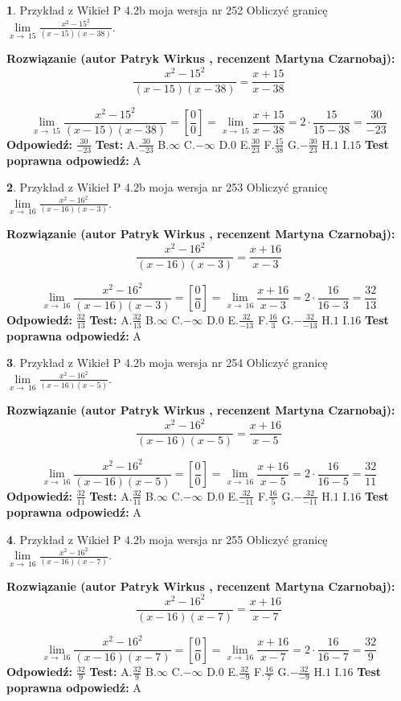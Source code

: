 \documentclass[12pt, a4paper]{article}
\theoremstyle{definition} %
\newtheorem{zad}{}
\newcommand{\zadStart}[1]{\begin{zad}#1\newline}
\newcommand{\zadStop}{\end{zad}}
\newcommand{\rozwStart}[2]{\noindent \textbf{Rozwiązanie (autor #1 , recenzent #2): }\newline}
\newcommand{\rozwStop}{\newline}
\newcommand{\odpStart}{\noindent \textbf{Odpowiedź:}\newline}
\newcommand{\odpStop}{\newline}
\newcommand{\testStart}{\noindent \textbf{Test:}\newline}
\newcommand{\testStop}{\newline}
\newcommand{\kluczStart}{\noindent \textbf{Test poprawna odpowiedź:}\newline}
\newcommand{\kluczStop}{\newline}
\begin{document}
\zadStart{Przykład z Wikieł P 4.2b moja wersja nr 252}
Obliczyć granicę $\lim\limits_{x\to\ 15}\frac{x^{2}-15^{2}}{(x-15)(x-38)}$.
\zadStop
\rozwStart{Patryk Wirkus}{Martyna Czarnobaj}
$$\frac{x^{2}-15^{2}}{(x-15)(x-38)}=\frac{x+15}{x-38}$$

$$\lim\limits_{x\to\ 15}\frac{x^{2}-15^{2}}{(x-15)(x-38)}=[\frac{0}{0}]=\lim\limits_{x\to\ 15}\frac{x+15}{x-38}=2 \cdot \frac{15}{15-38} = \frac{30}{-23}$$
\rozwStop
\odpStart
$\frac{30}{-23}$
\odpStop
\testStart
A.$\frac{30}{-23}$
B.$\infty$
C.$-\infty$
D.$0$
E.$\frac{30}{23}$
F.$\frac{15}{38}$
G.$-\frac{30}{23}$
H.$1$
I.$15$
\testStop
\kluczStart
A
\kluczStop



\zadStart{Przykład z Wikieł P 4.2b moja wersja nr 253}
Obliczyć granicę $\lim\limits_{x\to\ 16}\frac{x^{2}-16^{2}}{(x-16)(x-3)}$.
\zadStop
\rozwStart{Patryk Wirkus}{Martyna Czarnobaj}
$$\frac{x^{2}-16^{2}}{(x-16)(x-3)}=\frac{x+16}{x-3}$$

$$\lim\limits_{x\to\ 16}\frac{x^{2}-16^{2}}{(x-16)(x-3)}=[\frac{0}{0}]=\lim\limits_{x\to\ 16}\frac{x+16}{x-3}=2 \cdot \frac{16}{16-3} = \frac{32}{13}$$
\rozwStop
\odpStart
$\frac{32}{13}$
\odpStop
\testStart
A.$\frac{32}{13}$
B.$\infty$
C.$-\infty$
D.$0$
E.$\frac{32}{-13}$
F.$\frac{16}{3}$
G.$-\frac{32}{-13}$
H.$1$
I.$16$
\testStop
\kluczStart
A
\kluczStop



\zadStart{Przykład z Wikieł P 4.2b moja wersja nr 254}
Obliczyć granicę $\lim\limits_{x\to\ 16}\frac{x^{2}-16^{2}}{(x-16)(x-5)}$.
\zadStop
\rozwStart{Patryk Wirkus}{Martyna Czarnobaj}
$$\frac{x^{2}-16^{2}}{(x-16)(x-5)}=\frac{x+16}{x-5}$$

$$\lim\limits_{x\to\ 16}\frac{x^{2}-16^{2}}{(x-16)(x-5)}=[\frac{0}{0}]=\lim\limits_{x\to\ 16}\frac{x+16}{x-5}=2 \cdot \frac{16}{16-5} = \frac{32}{11}$$
\rozwStop
\odpStart
$\frac{32}{11}$
\odpStop
\testStart
A.$\frac{32}{11}$
B.$\infty$
C.$-\infty$
D.$0$
E.$\frac{32}{-11}$
F.$\frac{16}{5}$
G.$-\frac{32}{-11}$
H.$1$
I.$16$
\testStop
\kluczStart
A
\kluczStop



\zadStart{Przykład z Wikieł P 4.2b moja wersja nr 255}
Obliczyć granicę $\lim\limits_{x\to\ 16}\frac{x^{2}-16^{2}}{(x-16)(x-7)}$.
\zadStop
\rozwStart{Patryk Wirkus}{Martyna Czarnobaj}
$$\frac{x^{2}-16^{2}}{(x-16)(x-7)}=\frac{x+16}{x-7}$$

$$\lim\limits_{x\to\ 16}\frac{x^{2}-16^{2}}{(x-16)(x-7)}=[\frac{0}{0}]=\lim\limits_{x\to\ 16}\frac{x+16}{x-7}=2 \cdot \frac{16}{16-7} = \frac{32}{9}$$
\rozwStop
\odpStart
$\frac{32}{9}$
\odpStop
\testStart
A.$\frac{32}{9}$
B.$\infty$
C.$-\infty$
D.$0$
E.$\frac{32}{-9}$
F.$\frac{16}{7}$
G.$-\frac{32}{-9}$
H.$1$
I.$16$
\testStop
\kluczStart
A
\kluczStop
\end{document}
